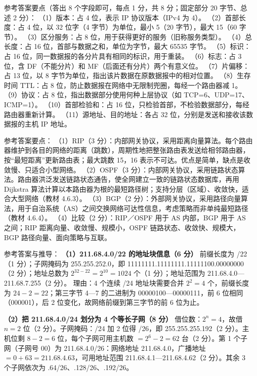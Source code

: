 \documentclass[a4paper,11pt]{article}
\begin{document}

\q 参考答案要点（答出 8 个字段即可，每点 1 分，共 8 分；固定部分 20 字节、总述 2 分）：
（1）版本：占 4 位，表示 IP 协议版本（IPv4 为 4）。
（2）首部长度：占 4 位，以 32 位字（4 字节）为单位，最小 5（20 字节），最大 15（60 字节）。
（3）区分服务：占 8 位，用于获得更好的服务（旧称服务类型）。
（4）总长度：占 16 位，首部与数据之和，单位为字节，最大 65535 字节。
（5）标识：占 16 位，同一数据报的各分片具有相同的标识，用于重装。
（6）标志：占 3 位，含 DF（不能分片）和 MF（后面还有分片）两个有意义位。
（7）片偏移：占 13 位，以 8 字节为单位，指出该片数据在原数据报中的相对位置。
（8）生存时间 TTL：占 8 位，防止数据报在网络中无限制兜圈，每经一个路由器减 1。
（9）协议：占 8 位，指出数据部分使用何种上层协议（如 TCP=6、UDP=17、ICMP=1）。
（10）首部检验和：占 16 位，只检验首部，不检验数据部分，每经路由器重新计算。
（11）源地址、目的地址：各占 32 位，分别是发送和接收该数据报的主机 IP 地址。

\q 参考答案要点：
（1）RIP（3 分）：内部网关协议，采用距离向量算法。每个路由器维护到各目的网络的距离（跳数），周期性地把整张路由表发送给相邻路由器，按“最短距离”更新路由表；最大跳数 15，16 表示不可达。优点是简单，缺点是收敛慢、只适合小型网络。
（2）OSPF（3 分）：内部网关协议，采用链路状态算法。路由器洪泛发送链路状态通告，使全网建立一致的链路状态数据库，再用 Dijkstra 算法计算以本路由器为根的最短路径树；支持分层（区域）、收敛快，适合大型网络（教材 4.6.3）。
（3）BGP（2 分）：外部网关协议，采用路径向量算法，用于自治系统（AS）之间交换网络可达性信息，考虑策略而非单纯最短路径（教材 4.6.4）。
（4）比较（2 分）：RIP／OSPF 用于 AS 内部，BGP 用于 AS 之间；RIP 距离向量、收敛慢、规模小，OSPF 链路状态、收敛快、规模大，BGP 路径向量、面向策略与互联。


\q 参考答案与推导：
\textbf{（1）211.68.4.0/22 的地址块信息（6 分）}
前缀长度为 /22（1 分）；子网掩码为 255.255.252.0，即 11111111.11111111.11111100.00000000（2 分）；地址总数为 $2^{32-22}=2^{10}=1024$ 个（1 分）；地址范围为 211.68.4.0—211.68.7.255（2 分）。
理由：4 个连续 /24 地址块需要合并 $2^{2}=4$ 个，前缀长度为 $24-2=22$；第三字节 4—7 的二进制为 00000100—00000111，前 6 位相同（000001），后 2 位变化，故网络前缀到第三字节的前 6 位为止。

\textbf{（2）把 211.68.4.0/24 划分为 4 个等长子网（8 分）}
借位数：$2^{n}=4$，故借 $n=2$ 位（2 分）。子网掩码：/24 加 2 位得 /26，即 255.255.255.192（2 分）。主机位剩 $8-2=6$ 位，每个子网可用主机数 $=2^{6}-2=62$ 台（2 分）。第 1 个子网（子网号 00）为 211.68.4.0/26：网络地址 211.68.4.0，广播地址 $=0+63=211.68.4.63$，可用地址范围 211.68.4.1—211.68.4.62（2 分）。其余 3 个子网依次为 .64/26、.128/26、.192/26。
\end{document}
